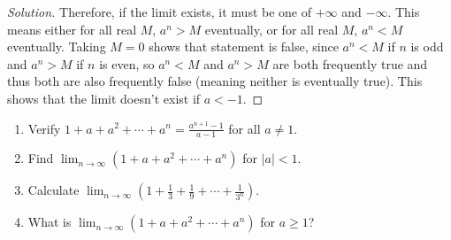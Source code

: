 \documentclass[11pt]{scrartcl}
\providecommand{\ii}{\item}
\theoremstyle{remark}
\newenvironment{problem}[1]
{\renewcommand\theinnercustomthm{\textit{#1}}\innercustomthm}
{\endinnercustomthm}
\newenvironment{soln}{\begin{proof}[Solution]}{\end{proof}}
\begin{document}
\begin{soln}
		Therefore, if the limit exists,
		it must be one of $+\infty$ and $-\infty$. This means either
		for all real $M$, $a^n > M$ eventually, or for all real $M$,
		$a^n < M$ eventually. Taking $M = 0$ shows that statement is false,
		since $a^n < M$ if $n$ is odd and $a^n > M$ if $n$ is even,
		so $a^n < M$ and $a^n > M$ are both frequently true
		and thus both are also frequently false
		(meaning neither is eventually true).
		This shows that the limit doesn't exist if $a < -1$.
	\end{soln}
	
	\pagebreak
	\begin{problem}{9.18}\phantom{buh}
		\begin{enumerate}[\textbf{(\alph*)}]
			\ii Verify $1 + a + a^2 + \cdots + a^n = \frac{a^{n+1} - 1}{a - 1}$
			for all $a\ne 1$.
			\ii Find $\lim_{n\to\infty} (1 + a + a^2 + \cdots + a^n)$ for $|a| < 1$.
			\ii Calculate
			$\lim_{n\to\infty}(1 + \frac13 + \frac19 + \cdots + \frac{1}{3^n})$.
			\ii What is $\lim_{n\to\infty} (1 + a + a^2 + \cdots + a^n)$
			for $a\ge1$?
		\end{enumerate}
	\end{problem}
\end{document}
